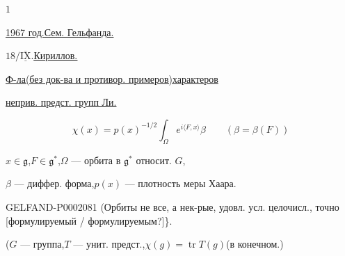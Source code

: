 \begin{flushright}$1$\end{flushright}



\underline{\underline{1967 год.}}\qquad\underline{Сем. Гельфанда.}



$18/\overline{\underline{\mathrm{IX}}}$.\quad\underline{\underline{Кириллов.}}



\underline{Ф-ла}\quad\underline{(без док-ва и противор. примеров)}\quad\underline{характеров}
\par\underline{неприв. предст. групп Ли.}



\begin{equation*}\chi(x)=p(x)^{-1/2}\int_{\Omega}e^{i\langle F,x\rangle}\beta\qquad(\beta=\beta(F))\end{equation*}



$x\in\mathfrak g$,\quad$F\in\mathfrak g^*$,\quad$\Omega$ --- орбита в $\mathfrak g^*$ относит. $G$,
\par$\beta$ --- диффер. форма,\quad$p(x)$ --- плотность меры Хаара.



\begin{GelfandAdjacentEvidence}{GELFAND-P000208}{1}
(Орбиты не все, а нек-рые, удовл. усл. целочисл., точно [формулируемый / формулируемым?]\}.
\end{GelfandAdjacentEvidence}

($G$ --- группа,\quad$T$ --- унит. предст.,\quad$\chi(g)=\operatorname{tr}T(g)$\quad(в конечном.)



